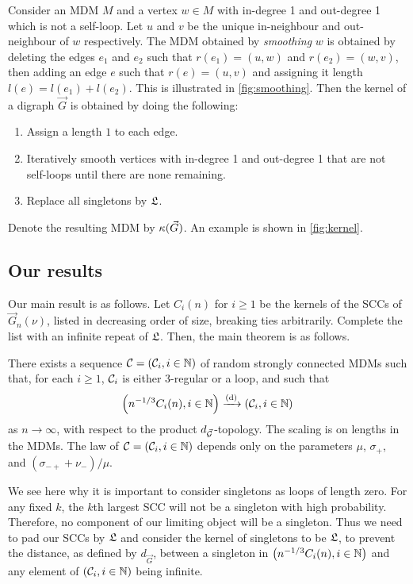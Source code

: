Consider an MDM $M$ and a vertex $w \in M$ with in-degree 1 and out-degree 1 which is not a self-loop. Let $u$ and $v$ be the unique in-neighbour and out-neighbour of $w$ respectively. The MDM obtained by \emph{smoothing} $w$ is obtained by deleting the edges $e_1$ and $e_2$ such that $r(e_1) = (u, w)$ and $r(e_2) = (w, v)$, then adding an edge $e$ such that $r(e) = (u, v)$ and assigning it length $l(e) = l(e_1) + l(e_2)$. This is illustrated in \cref{fig:smoothing}. Then the kernel of a digraph $\vec{G}$ is obtained by doing the following:
\begin{enumerate}
    \item Assign a length $1$ to each edge.
    \item Iteratively smooth vertices with in-degree 1 and out-degree 1 that are not self-loops until there are none remaining.
    \item Replace all singletons by $\mathfrak L$.
\end{enumerate}
Denote the resulting MDM by $\kappa(\vec{G})$. An example is shown in \cref{fig:kernel}.

\subsection{Our results}

Our main result is as follows. Let $C_i(n)$ for $i\geq 1$ be the kernels of the SCCs of $\vec{G}_n(\nu)$, listed in decreasing order of size, breaking ties arbitrarily. Complete the list with an infinite repeat of $\mathfrak L$. Then, the main theorem is as follows.
\begin{theorem}\label{thm.main}
There exists a sequence ${\mathcal C}=({\mathcal C}_i,i\in {\mathbb N})$ of random strongly connected MDMs such that, for each $i\geq 1$, ${\mathcal C}_i$ is either $3$-regular or a loop, and such that 
$$\left(n^{-1/3}C_i(n),i\in {\mathbb N}\right)\xrightarrow[]{\mathrm{(d)}}\left({\mathcal C}_i,i\in {\mathbb N}\right)$$
as $n\to \infty$, with respect to the product $d_{\vec{{\mathcal G}}}$-topology. The scaling is on lengths in the MDMs. The law of ${\mathcal C}=({\mathcal C}_i,i\in {\mathbb N})$ depends only on the parameters $\mu$, $\sigma_+$, and $(\sigma_{-+}+\nu_-)/\mu$.
\end{theorem}
We see here why it is important to consider singletons as loops of length zero. For any fixed $k$, the $k$th largest SCC will not be a singleton with high probability. Therefore, no component of our limiting object will be a singleton. Thus we need to pad our SCCs by $\mathfrak L$ and consider the kernel of singletons to be $\mathfrak L$, to prevent the distance, as defined by $d_{\vec{G}}$, between a singleton in $\left(n^{-1/3}C_i(n),i\in {\mathbb N}\right)$ and any element of $\left({\mathcal C}_i,i\in {\mathbb N}\right)$ being infinite.

